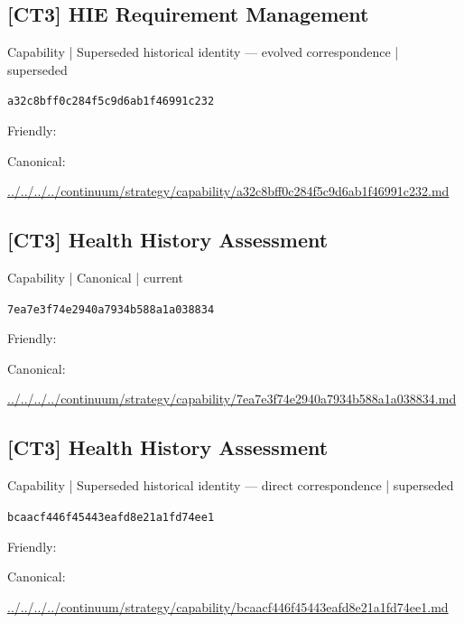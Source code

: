 \documentclass[10pt,a4paper]{article}
\begin{document}
\subsection*{[CT3] HIE Requirement Management}
{\small Capability | Superseded historical identity — evolved correspondence | superseded}\par
\texttt{a32c8bff0c284f5c9d6ab1f46991c232}\par
Friendly: \par
Canonical: \par
{\footnotesize\url{../../../../continuum/strategy/capability/a32c8bff0c284f5c9d6ab1f46991c232.md}}\par
\subsection*{[CT3] Health History Assessment}
{\small Capability | Canonical | current}\par
\texttt{7ea7e3f74e2940a7934b588a1a038834}\par
Friendly: \par
Canonical: \par
{\footnotesize\url{../../../../continuum/strategy/capability/7ea7e3f74e2940a7934b588a1a038834.md}}\par
\subsection*{[CT3] Health History Assessment}
{\small Capability | Superseded historical identity — direct correspondence | superseded}\par
\texttt{bcaacf446f45443eafd8e21a1fd74ee1}\par
Friendly: \par
Canonical: \par
{\footnotesize\url{../../../../continuum/strategy/capability/bcaacf446f45443eafd8e21a1fd74ee1.md}}\par
\end{document}
